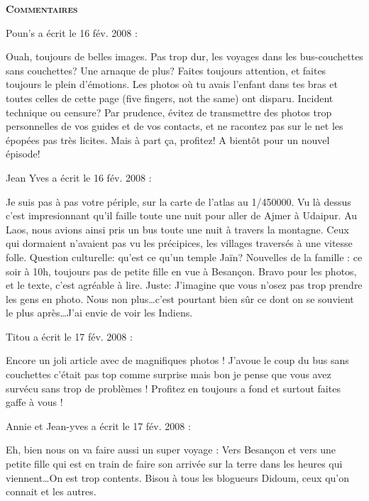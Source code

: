 \bigskip
\textbf{\textsc{Commentaires}}

\medskip
Poun's a écrit le 16 fév. 2008 :
\begin{displayquote}
Ouah, toujours de belles images. Pas trop dur, les voyages dans les bus-couchettes sans couchettes?
Une arnaque de plus? Faites toujours attention, et faites toujours le plein d'émotions.
Les photos où tu avais l'enfant dans tes bras et toutes celles de cette page (five fingers, not the same) ont disparu. Incident technique ou censure?
Par prudence, évitez de transmettre des photos trop personnelles de vos guides et de vos contacts, et ne racontez pas sur le net les épopées pas très licites.
Mais à part ça, profitez!
A bientôt pour un nouvel épisode!
\end{displayquote}

\medskip
Jean Yves a écrit le 16 fév. 2008 :
\begin{displayquote}
Je suis pas à pas votre périple, sur la carte de l'atlas au 1/450000. Vu là dessus c'est impresionnant qu'il faille toute une nuit pour aller de Ajmer à Udaipur. Au Laos, nous avions ainsi pris un bus toute une nuit à travers la montagne. Ceux qui dormaient n'avaient pas vu les précipices, les villages traversés à une vitesse folle.
Question culturelle: qu'est ce qu'un temple Jaïn?
Nouvelles de la famille : ce soir à 10h, toujours pas de petite fille en vue à Besançon.
Bravo pour les photos, et le texte, c'est agréable à lire.
Juste: J'imagine que vous n'osez pas trop prendre les gens en photo. Nous non plus\dots c'est pourtant bien sûr ce dont on se souvient le plus après\dots J'ai envie de voir les Indiens.
\end{displayquote}

\medskip
Titou a écrit le 17 fév. 2008 :
\begin{displayquote}
Encore un joli article avec de magnifiques photos ! J'avoue le coup du bus sans couchettes c'était pas top comme surprise mais bon je pense que vous avez survécu sans trop de problèmes ! Profitez en toujours a fond et surtout faites gaffe à vous !
\end{displayquote}

\medskip
Annie et Jean-yves a écrit le 17 fév. 2008 :
\begin{displayquote}
Eh, bien nous on va faire aussi un super voyage :
Vers Besançon et vers une petite fille qui est en train de faire son arrivée sur la terre dans les heures qui viennent\dots On est trop contents. Bisou à tous les blogueurs Didoum, ceux qu'on connait et les autres.
\end{displayquote}

